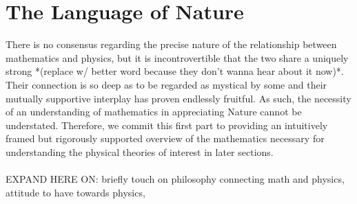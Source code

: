 \documentclass[12pt, twoside, openany]{book}
\newcommand{\1}{\mathbbm{1}}
\numberwithin{conceptctr}{section}
\begin{document}
\tableofcontents
\cleardoublepage
{}
\part{The Language of Nature}
There is no consensus regarding the precise nature of the relationship between mathematics and physics, but it is incontrovertible that the two share a uniquely strong *(replace w/ better word because they don't wanna hear about it now)*.  Their connection is so deep as to be regarded as mystical by some and their mutually supportive interplay has proven endlessly fruitful.  As such, the necessity of an understanding of mathematics in appreciating Nature cannot be understated.  Therefore, we commit this first part to providing an intuitively framed but rigorously supported overview of the mathematics necessary for understanding the physical theories of interest in later sections.\\\\
EXPAND HERE ON: briefly touch on philosophy connecting math and physics, attitude to have towards physics,     

\printindex
\end{document}
